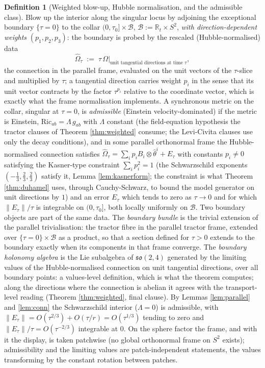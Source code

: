 \documentclass[11pt]{article}
\theoremstyle{definition}
\newtheorem{definition}[theorem]{Definition}
\newcommand{\R}{\mathbb{R}}
\newcommand{\Ric}{\mathrm{Ric}}
\begin{document}
\begin{definition}[Weighted blow-up, Hubble normalisation, and the admissible class]\label{def:blowup}
Blow up the interior along the singular locus by adjoining the exceptional boundary $\{\tau = 0\}$ to the collar $(0,\tau_0] \times \mathcal{B}$, $\mathcal{B} := \R_t \times S^2$, \emph{with direction-dependent weights} $(p_1, p_2, p_3)$: the boundary is probed by the rescaled (Hubble-normalised) data
\[
\widehat\Omega_\tau \;:=\; \tau\,\Omega\big|_{\text{unit tangential directions at time } \tau},
\]
the connection in the parallel frame, evaluated on the unit vectors of the $\tau$-slice and multiplied by $\tau$; a tangential direction carries weight $p_i$ in the sense that its unit vector contracts by the factor $\tau^{p_i}$ relative to the coordinate vector, which is exactly what the frame normalisation implements. A synchronous metric on the collar, singular at $\tau = 0$, is \emph{admissible} (Einstein velocity-dominated) if the metric is Einstein, $\Ric_{ab} = \Lambda\, g_{ab}$ with $\Lambda$ constant (the field-equation hypothesis the tractor clauses of Theorem \ref{thm:weighted} consume; the Levi-Civita clauses use only the decay conditions), and in some parallel orthonormal frame the Hubble-normalised connection satisfies $\widehat\Omega_\tau = \sum_i p_i B_i \otimes \hat\theta^i + E_\tau$ with constants $p_i \neq 0$ satisfying the Kasner-type constraint $\sum_i p_i^2 = 1$ (the Schwarzschild exponents $(-\tfrac13, \tfrac23, \tfrac23)$ satisfy it, Lemma \ref{lem:kasnerform}; the constraint is what Theorem \ref{thm:duhamel} uses, through Cauchy-Schwarz, to bound the model generator on unit directions by $1$) and an error $E_\tau$ which tends to zero as $\tau \to 0$ and for which $\|E_\tau\|/\tau$ is integrable on $(0, \tau_0]$, both locally uniformly on $\mathcal{B}$. Two boundary objects are part of the same data. The \emph{boundary bundle} is the trivial extension of the parallel trivialisation: the tractor fibre in the parallel tractor frame, extended over $\{\tau = 0\} \times \mathcal{B}$ as a product, so that a section defined for $\tau > 0$ extends to the boundary exactly when its components in that frame converge. The \emph{boundary holonomy algebra} is the Lie subalgebra of $\mathfrak{so}(2,4)$ generated by the limiting values of the Hubble-normalised connection on unit tangential directions, over all boundary points: a values-level definition, which is what the theorem computes; along the directions where the connection is abelian it agrees with the transport-level reading (Theorem \ref{thm:weighted}, final clause). By Lemmas \ref{lem:parallel} and \ref{lem:conn} the Schwarzschild interior ($\Lambda = 0$) is admissible, with $\|E_\tau\| = O(\tau^{2/3}) + O(\tau/r) = O(\tau^{1/3})$ tending to zero and $\|E_\tau\|/\tau = O(\tau^{-2/3})$ integrable at $0$. On the sphere factor the frame, and with it the display, is taken patchwise (no global orthonormal frame on $S^2$ exists); admissibility and the limiting values are patch-independent statements, the values transforming by the constant rotation between patches.
\end{definition}
\end{document}
